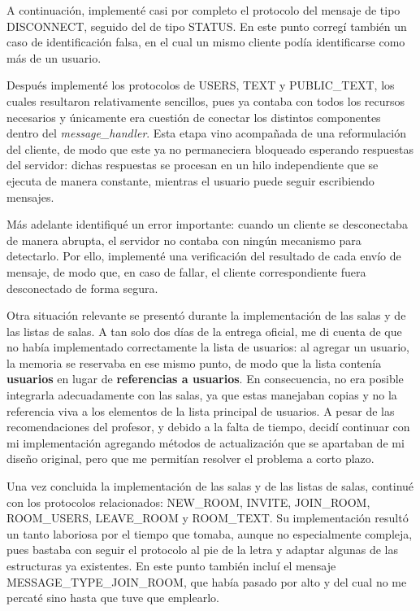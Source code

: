 \documentclass{article}
\begin{document}
    A continuación, implementé casi por completo el protocolo del mensaje de tipo DISCONNECT, seguido del de tipo STATUS. En este punto corregí también un caso de identificación falsa, en el cual un mismo cliente podía identificarse como más de un usuario.

    Después implementé los protocolos de USERS, TEXT y PUBLIC\_TEXT, los cuales resultaron relativamente sencillos, pues ya contaba con todos los recursos necesarios y únicamente era cuestión de conectar los distintos componentes dentro del \textit{message\_handler}. Esta etapa vino acompañada de una reformulación del cliente, de modo que este ya no permaneciera bloqueado esperando respuestas del servidor: dichas respuestas se procesan en un hilo independiente que se ejecuta de manera constante, mientras el usuario puede seguir escribiendo mensajes.

    Más adelante identifiqué un error importante: cuando un cliente se desconectaba de manera abrupta, el servidor no contaba con ningún mecanismo para detectarlo. Por ello, implementé una verificación del resultado de cada envío de mensaje, de modo que, en caso de fallar, el cliente correspondiente fuera desconectado de forma segura.

    Otra situación relevante se presentó durante la implementación de las salas y de las listas de salas. A tan solo dos días de la entrega oficial, me di cuenta de que no había implementado correctamente la lista de usuarios: al agregar un usuario, la memoria se reservaba en ese mismo punto, de modo que la lista contenía \textbf{usuarios} en lugar de \textbf{referencias a usuarios}. En consecuencia, no era posible integrarla adecuadamente con las salas, ya que estas manejaban copias y no la referencia viva a los elementos de la lista principal de usuarios. A pesar de las recomendaciones del profesor, y debido a la falta de tiempo, decidí continuar con mi implementación agregando métodos de actualización que se apartaban de mi diseño original, pero que me permitían resolver el problema a corto plazo.

    Una vez concluida la implementación de las salas y de las listas de salas, continué con los protocolos relacionados: NEW\_ROOM, INVITE, JOIN\_ROOM, ROOM\_USERS, LEAVE\_ROOM y ROOM\_TEXT. Su implementación resultó un tanto laboriosa por el tiempo que tomaba, aunque no especialmente compleja, pues bastaba con seguir el protocolo al pie de la letra y adaptar algunas de las estructuras ya existentes. En este punto también incluí el mensaje MESSAGE\_TYPE\_JOIN\_ROOM, que había pasado por alto y del cual no me percaté sino hasta que tuve que emplearlo.
\end{document}
